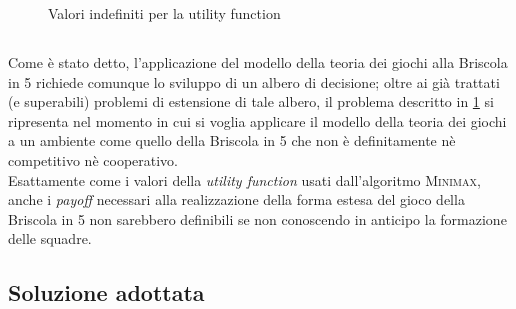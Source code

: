 \begin{figure}[!htbp]

\caption{Valori indefiniti per la utility function}
\label{alberoutility}
\end{figure}

\subsection*{}

Come è stato detto, l'applicazione del modello della teoria dei giochi alla Briscola in 5 richiede comunque lo sviluppo di un albero di decisione; oltre ai già trattati (e superabili) problemi di estensione di tale albero, il problema descritto in \ref{alberoutility} si ripresenta nel momento in cui si voglia applicare il modello della teoria dei giochi a un ambiente come quello della Briscola in 5 che non è definitamente nè competitivo nè cooperativo.\\
Esattamente come i valori della \emph{utility function} usati dall'algoritmo \textsc{Minimax}, anche i \emph{payoff} necessari alla realizzazione della forma estesa del gioco della Briscola in 5 non sarebbero definibili se non conoscendo in anticipo la formazione delle squadre.


\subsection{Soluzione adottata}


